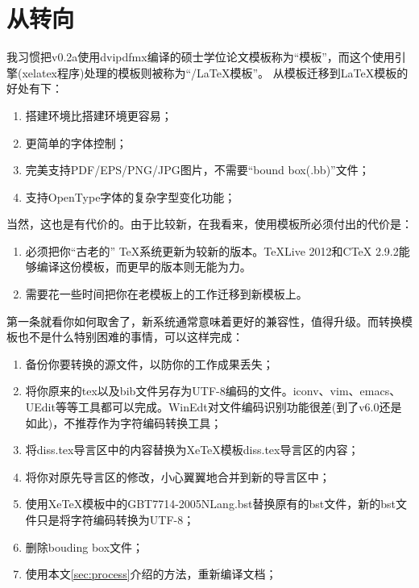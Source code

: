 \chapter{从{\CJKLaTeX}转向{\XeTeX}}
\label{chap:whydvipdfm}

我习惯把v0.2a使用dvipdfmx编译的硕士学位论文模板称为“{\CJKLaTeX}模板”，而这个使用{\XeTeX}引擎(xelatex程序)处理的模板则被称为“{\XeTeX/\LaTeX}模板”。
从{\CJKLaTeX}模板迁移到{\XeTeX\LaTeX}模板的好处有下：
\begin{enumerate}
\item[\large\smiley] 搭建{\XeTeX}环境比搭建{\CJKLaTeX}环境更容易；
\item[\large\smiley] 更简单的字体控制；
\item[\large\smiley] 完美支持PDF/EPS/PNG/JPG图片，不需要“bound box(.bb)”文件；
\item[\large\smiley] 支持OpenType字体的复杂字型变化功能；
\end{enumerate}

当然，这也是有代价的。由于{\XeTeX}比较新，在我看来，使用{\XeTeX}模板所必须付出的代价是：

\begin{enumerate}
\item[\large\frownie] 必须把你“古老的” \TeX 系统更新为较新的版本。TeXLive 2012和CTeX 2.9.2能够编译这份模板，而更早的版本则无能为力。
\item[\large\frownie] 需要花一些时间把你在老模板上的工作迁移到新模板上。
\end{enumerate}

第一条就看你如何取舍了，新系统通常意味着更好的兼容性，值得升级。而转换模板也不是什么特别困难的事情，可以这样完成：

\begin{enumerate}
\item 备份你要转换的源文件，以防你的工作成果丢失；
\item 将你原来的tex以及bib文件另存为UTF-8编码的文件。iconv、vim、emacs、UEdit等等工具都可以完成。WinEdt对文件编码识别功能很差(到了v6.0还是如此)，不推荐作为字符编码转换工具；
\item 将diss.tex导言区中的内容替换为XeTeX模板diss.tex导言区的内容；
\item 将你对原先导言区的修改，小心翼翼地合并到新的导言区中；
\item 使用XeTeX模板中的GBT7714-2005NLang.bst替换原有的bst文件，新的bst文件只是将字符编码转换为UTF-8；
\item 删除bouding box文件；
\item 使用本文\ref{sec:process}介绍的方法，重新编译文档；
\end{enumerate}

